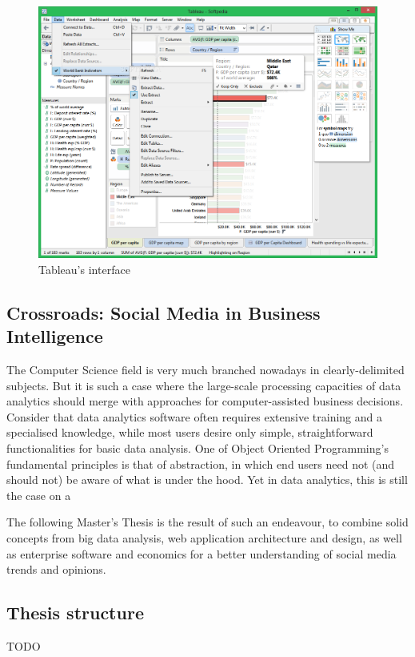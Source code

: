 \begin{figure}[ht]
    \centering
\includegraphics[width=0.8\columnwidth]{img/Tableau-Desktop_3.png}
    \caption{Tableau's interface}
    \label{fig:tableau}
\end{figure}

\subsection{Crossroads: Social Media in Business Intelligence}

The Computer Science field is very much branched nowadays in clearly-delimited subjects. But it is such a case where the large-scale processing capacities of data analytics should merge with approaches for computer-assisted business decisions. Consider that data analytics software often requires extensive training and a specialised knowledge, while most users desire only simple, straightforward functionalities for basic data analysis. One of Object Oriented Programming's fundamental principles is that of abstraction, in which end users need not (and should not) be aware of what is under the hood. Yet in data analytics, this is still the case on a 

The following Master's Thesis is the result of such an endeavour, to combine solid concepts from big data analysis, web application architecture and design, as well as enterprise software and economics for a better understanding of social media trends and opinions.

\subsection*{Thesis structure}
{\color{red} TODO
}
